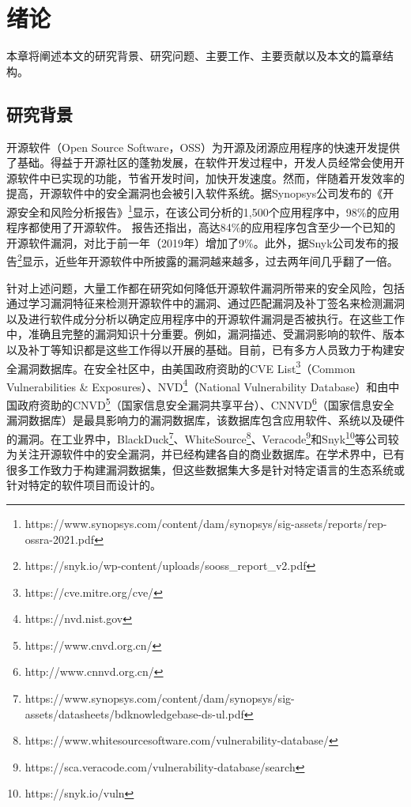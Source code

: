 \chapter{绪论}

本章将阐述本文的研究背景、研究问题、主要工作、主要贡献以及本文的篇章结构。

\section{研究背景}

开源软件（Open Source Software，OSS）为开源及闭源应用程序的快速开发提供了基础。得益于开源社区的蓬勃发展，在软件开发过程中，开发人员经常会使用开源软件中已实现的功能，节省开发时间，加快开发速度\cite{Wang2020empirical}。然而，伴随着开发效率的提高，开源软件中的安全漏洞也会被引入软件系统\cite{2何熙巽2020软件供应链安全综述,3刘剑2018软件与网络安全研究综述}。据Synopsys公司发布的《开源安全和风险分析报告》\footnote{https://www.synopsys.com/content/dam/synopsys/sig-assets/reports/rep-ossra-2021.pdf}显示，在该公司分析的1,500个应用程序中，98\%的应用程序都使用了开源软件。
报告还指出，高达84\%的应用程序包含至少一个已知的开源软件漏洞，对比于前一年（2019年）增加了9\%。此外，据Snyk公司发布的报告\footnote{https://snyk.io/wp-content/uploads/sooss\_report\_v2.pdf}显示，近些年开源软件中所披露的漏洞越来越多，过去两年间几乎翻了一倍。

针对上述问题，大量工作都在研究如何降低开源软件漏洞所带来的安全风险，包括通过学习漏洞特征来检测开源软件中的漏洞\cite{li2016vulpecker,li2018vuldeepecker,zhou2019devign,jimenez2019importance}、通过匹配漏洞及补丁签名来检测漏洞\cite{jang2012redebug, kim2017vuddy, xu2020patch, xiao2020mvp, cui2020vuldetector}%
以及进行软件成分分析以确定应用程序中的开源软件漏洞是否被执行\cite{pashchenko2018vulnerable, ponta2020detection, pashchenko2020vuln4real, Wang2020empirical}。在这些工作中，准确且完整的漏洞知识十分重要。例如，漏洞描述、受漏洞影响的软件、版本以及补丁等知识都是这些工作得以开展的基础。目前，已有多方人员致力于构建安全漏洞数据库。在安全社区中，由美国政府资助的CVE List\footnote{https://cve.mitre.org/cve/}（Common Vulnerabilities \& Exposures）、NVD\footnote{https://nvd.nist.gov}（National Vulnerability Database）和由中国政府资助的CNVD\footnote{https://www.cnvd.org.cn/}（国家信息安全漏洞共享平台）、CNNVD\footnote{http://www.cnnvd.org.cn/}（国家信息安全漏洞数据库）是最具影响力的漏洞数据库，该数据库包含应用软件、系统以及硬件的漏洞。在工业界中，BlackDuck\footnote{https://www.synopsys.com/content/dam/synopsys/sig-assets/datasheets/bdknowledgebase-ds-ul.pdf}、WhiteSource\footnote{https://www.whitesourcesoftware.com/vulnerability-database/}、Veracode\footnote{https://sca.veracode.com/vulnerability-database/search}和Snyk\footnote{https://snyk.io/vuln}等公司较为关注开源软件中的安全漏洞，并已经构建各自的商业数据库。在学术界中，已有很多工作致力于构建漏洞数据集\cite{ponta2019manually,fan2020ac,jimenez2018enabling,gkortzis2018vulinoss,namrud2019androvul}，但这些数据集大多是针对特定语言的生态系统或针对特定的软件项目而设计的。

